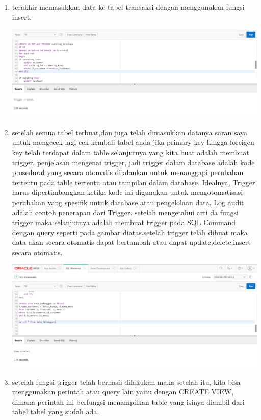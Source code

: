 \documentclass[a4paper, 12pt]{article}
\begin{document}
\begin{enumerate}
\begin{center}
\end{center}
\item terakhir memasukkan data ke tabel transaksi dengan menggunakan fungsi insert.
\begin{center}
    \includegraphics[width=.8\textwidth]{figure/27.PNG}
\end{center}
\item  setelah semua tabel terbuat,dan juga telah dimasukkan datanya saran saya untuk mengecek lagi cek kembali tabel anda jika primary key hingga foreigen key telah terdapat dalam table selanjutnya yang kita buat adalah membuat trigger. penjelasan mengenai trigger, jadi trigger dalam database adalah kode prosedural yang secara otomatis dijalankan untuk menanggapi perubahan tertentu pada table tertentu atau tampilan dalam database. Idealnya, Trigger harus dipertimbangkan ketika kode ini digunakan untuk mengotomatisasi perubahan yang spesiﬁk untuk database atau pengelolaan data. Log audit adalah contoh penerapan dari Trigger. setelah mengetahui arti da fungsi trigger maka selanjutnya adalah membuat trigger pada SQL Command dengan query seperti pada gambar diatas.setelah trigger telah dibuat maka data akan secara otomatis dapat bertambah atau dapat update,delete,insert secara otomatis.
\begin{center}
    \includegraphics[width=.8\textwidth]{figure/28.PNG}
\end{center} 
\item setelah fungsi trigger telah berhasil dilakukan maka setelah itu, kita bisa menggunakan perintah atau query lain yaitu dengan CREATE VIEW, dimana perintah ini berfungsi menampilkan table yang isinya diambil dari tabel tabel yang sudah ada.

\end{enumerate}
\end{document}
